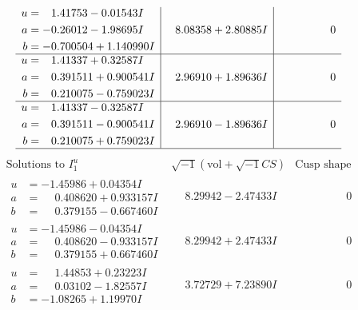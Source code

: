 \documentclass[1p]{elsarticle_modified}
\theoremstyle{definition}
\newcommand{\I}{\sqrt{-1}}
\begin{document}
$$\begin{array}{c|c|c}
\begin{aligned}
u &= \phantom{-}1.41753 - 0.01543 I \\
a &= -0.26012 - 1.98695 I \\
b &= -0.700504 + 1.140990 I\end{aligned}
 & \phantom{-}8.08358 + 2.80885 I & \phantom{-0.000000 } 0 \\ \hline\begin{aligned}
u &= \phantom{-}1.41337 + 0.32587 I \\
a &= \phantom{-}0.391511 + 0.900541 I \\
b &= \phantom{-}0.210075 - 0.759023 I\end{aligned}
 & \phantom{-}2.96910 + 1.89636 I & \phantom{-0.000000 } 0 \\ \hline\begin{aligned}
u &= \phantom{-}1.41337 - 0.32587 I \\
a &= \phantom{-}0.391511 - 0.900541 I \\
b &= \phantom{-}0.210075 + 0.759023 I\end{aligned}
 & \phantom{-}2.96910 - 1.89636 I & \phantom{-0.000000 } 0\\
 \hline 
 \end{array}$$\newpage$$\begin{array}{c|c|c}  
\text{Solutions to }I^u_{1}& \I (\text{vol} + \sqrt{-1}CS) & \text{Cusp shape}\\
 \hline 
\begin{aligned}
u &= -1.45986 + 0.04354 I \\
a &= \phantom{-}0.408620 + 0.933157 I \\
b &= \phantom{-}0.379155 - 0.667460 I\end{aligned}
 & \phantom{-}8.29942 - 2.47433 I & \phantom{-0.000000 } 0 \\ \hline\begin{aligned}
u &= -1.45986 - 0.04354 I \\
a &= \phantom{-}0.408620 - 0.933157 I \\
b &= \phantom{-}0.379155 + 0.667460 I\end{aligned}
 & \phantom{-}8.29942 + 2.47433 I & \phantom{-0.000000 } 0 \\ \hline\begin{aligned}
u &= \phantom{-}1.44853 + 0.23223 I \\
a &= \phantom{-}0.03102 - 1.82557 I \\
b &= -1.08265 + 1.19970 I\end{aligned}
 & \phantom{-}3.72729 + 7.23890 I & \phantom{-0.000000 } 0 \\ \hline\begin{aligned}

\end{aligned}
\end{array}$$
\end{document}
